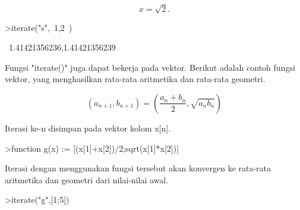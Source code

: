 \documentclass[12pt,arial,letterpaper]{book}
\begin{document}
\begin{eulernootebook}
\begin{eulercomment}
\begin{eulercomment}
\begin{eulernootebook}
\begin{eulercomment}
\begin{eulercomment}
\begin{eulercomment}
\begin{eulercomment}
\begin{eulercomment}
\begin{eulercomment}
\begin{eulernotebook}
\begin{eulercomment}
\begin{eulercomment}
\begin{eulercomment}
\begin{eulercomment}
\begin{eulercomment}
\begin{eulercomment}
\begin{eulercomment}
\begin{eulercomment}
\begin{eulercomment}
\begin{eulercomment}
\begin{eulercomment}
\begin{eulercomment}
\begin{eulercomment}
\begin{eulercomment}
\begin{eulercomment}
\begin{eulercomment}
\begin{eulercomment}
\begin{eulercomment}
\begin{eulercomment}
\begin{eulercomment}
\begin{eulercomment}
\begin{eulercomment}
\begin{eulercomment}
\begin{eulercomment}
\begin{eulercomment}
\begin{eulercomment}
\begin{eulercomment}
\begin{eulercomment}
\begin{eulercomment}
\begin{eulercomment}
\begin{eulercomment}
\end{eulercomment}
\begin{eulerformula}
\[
x = \sqrt2.
\]
\end{eulerformula}
\begin{eulerprompt}
>iterate("s",~1,2~)
\end{eulerprompt}
\begin{euleroutput}
  ~1.41421356236,1.41421356239~
\end{euleroutput}
\begin{eulercomment}
Fungsi "iterate()" juga dapat bekerja pada vektor. Berikut adalah
contoh fungsi vektor, yang menghasilkan rata-rata aritmetika dan
rata-rata geometri.

\end{eulercomment}
\begin{eulerformula}
\[
(a_{n+1},b_{n+1}) = \left( \frac{a_n+b_n}{2}, \sqrt{a_nb_n} \right)
\]
\end{eulerformula}
\begin{eulercomment}
Iterasi ke-n disimpan pada vektor kolom x[n].
\end{eulercomment}
\begin{eulerprompt}
>function g(x) := [(x[1]+x[2])/2;sqrt(x[1]*x[2])]
\end{eulerprompt}
\begin{eulercomment}
Iterasi dengan menggunakan fungsi tersebut akan konvergen ke rata-rata
aritmetika dan geometri dari nilai-nilai awal. 
\end{eulercomment}
\begin{eulerprompt}
>iterate("g",[1;5])
\end{eulerprompt}

\end{eulercomment}
\end{eulercomment}
\end{eulercomment}
\end{eulercomment}
\end{eulercomment}
\end{eulercomment}
\end{eulercomment}
\end{eulercomment}
\end{eulercomment}
\end{eulercomment}
\end{eulercomment}
\end{eulercomment}
\end{eulercomment}
\end{eulercomment}
\end{eulercomment}
\end{eulercomment}
\end{eulercomment}
\end{eulercomment}
\end{eulercomment}
\end{eulercomment}
\end{eulercomment}
\end{eulercomment}
\end{eulercomment}
\end{eulercomment}
\end{eulercomment}
\end{eulercomment}
\end{eulercomment}
\end{eulercomment}
\end{eulercomment}
\end{eulercomment}
\end{eulernotebook}
\end{eulercomment}
\end{eulercomment}
\end{eulercomment}
\end{eulercomment}
\end{eulercomment}
\end{eulercomment}
\end{eulernootebook}
\end{eulercomment}
\end{eulercomment}
\end{eulernootebook}
\end{document}

